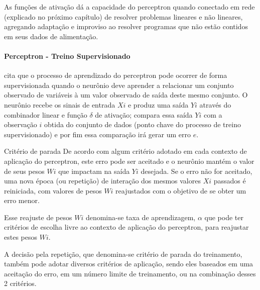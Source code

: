 \documentclass[	12pt, Times, openright, twoside, a4paper, english, brazil]{abntex2}
\begin{document}
				As funções de ativação dá a capacidade do perceptron quando conectado em rede (explicado no próximo capítulo) de resolver problemas lineares e não lineares, agregando adaptação e improviso ao resolver programas que não estão contidos em seus dados de alimentação.
			
		  \paragraph*{Perceptron - Treino Supervisionado}
            \cite{Braga2000} cita que o processo de aprendizado do perceptron pode ocorrer de forma supervisionada quando o neurônio deve aprender a relacionar um conjunto observado de variáveis à um valor observado de saída deste mesmo conjunto. O neurônio recebe os sinais de entrada $Xi$ e produz uma saída $Yi$ através do combinador linear e função $\delta$ de ativação; compara essa saída $Yi$ com a observação $i$ obtida do conjunto de dados (ponto chave do processo de treino supervisionado) e por fim essa comparação irá gerar um erro $e$.
            
           Critério de parada
            De acordo com algum critério adotado em cada contexto de aplicação do perceptron, este erro pode ser aceitado e o neurônio mantém o valor de seus pesos $Wi$ que impactam na saída $Yi$ desejada. Se o erro não for aceitado, uma nova época (ou repetição) de interação dos mesmos valores $Xi$ passados é reiniciada, com valores de pesos $Wi$ reajustados com o objetivo de se obter um erro menor.
            
            Esse reajuste de pesos $Wi$ denomina-se taxa de aprendizagem, $\alpha$ que pode ter critérios de escolha livre ao contexto de aplicação do perceptron, para reajustar estes pesos $Wi$.
            
            A decisão pela repetição, que denomina-se critério de parada do treinamento, também pode adotar diversos critérios de aplicação, sendo eles baseados em uma aceitação do erro, em um número limite de treinamento, ou na combinação desses 2 critérios.
            
\end{document}
